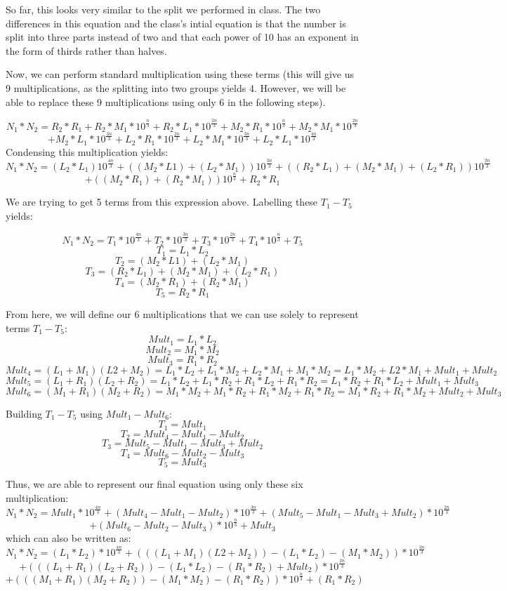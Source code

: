 \documentclass[11pt, solution, letterpaper]{format}
\begin{document}
So far, this looks very similar to the split we performed in class. The two differences in this equation and the class's intial equation is that the number is split into three parts instead of two and that each power of 10 has an exponent in the form of thirds rather than halves.

Now, we can perform standard multiplication using these terms (this will give us 9 multiplications, as the splitting into two groups yields 4. However, we will be able to replace these 9 multiplications using only 6 in the following steps).

$$N_1 * N_2 = R_2 * R_1 + R_2 * M_1 * 10^{\frac{n}{3}} + R_2 * L_1 * 10^{\frac{2n}{3}}  + M_2 * R_1 * 10^{\frac{n}{3}}  + M_2 * M_1 * 10^{\frac{2n}{3}} $$
$$+ M_2 * L_1 * 10^{\frac{3n}{3}} + L_2 * R_1 * 10^{\frac{2n}{3}} + L_2 * M_1 * 10^{\frac{3n}{3}} + L_2 * L_1 * 10^{\frac{4n}{3}}$$
Condensing this multiplication yields:
$$N_1 * N_2 = (L_2 * L_1)10^{\frac{4n}{3}} + ((M_2 * L1) + (L_2 * M_1))10^{\frac{3n}{3}} + ((R_2 * L_1) + (M_2 * M_1) + (L_2 * R_1))10^{\frac{2n}{3}} $$
$$+ ((M_2 * R_1) + (R_2 * M_1))10^{\frac{n}{3}} + R_2 * R_1$$

We are trying to get 5 terms from this expression above.
Labelling these $T_1 - T_5$ yields:

$$N_1 * N_2 = T_1*10^{\frac{4n}{3}} + T_2*10^{\frac{3n}{3}} + T_3*10^{\frac{2n}{3}} + T_4*10^{\frac{n}{3}} + T_5$$
$$T_1 = L_1 * L_2$$
$$T_2 = (M_2 * L1) + (L_2 * M_1) $$
$$T_3 = (R_2 * L_1) + (M_2 * M_1) + (L_2 * R_1) $$
$$T_4 =  (M_2 * R_1) + (R_2 * M_1)$$
$$T_5 = R_2 * R_1$$

From here, we will define our 6 multiplications that we can use solely to represent terms $T_1 - T_5$:
$$Mult_1 = L_1 * L_2 $$
$$Mult_2 = M_1 * M_2 $$
$$Mult_3 = R_1 * R_2 $$
$$Mult_4 = (L_1 + M_1)(L2 + M_2) = L_1*L_2 + L_1*M_2 + L_2*M_1 + M_1 * M_2 = L_1*M_2 + L2*M_1 + Mult_1 + Mult_2 $$
$$Mult_5 = (L_1 + R_1)(L_2 + R_2) = L_1*L_2 + L_1*R_2 + R_1*L_2 + R_1 * R_2 = L_1*R_2 + R_1*L_2 + Mult_1 + Mult_3 $$
$$Mult_6 = (M_1 + R_1)(M_2 + R_2) = M_1*M_2 + M_1*R_2 + R_1*M_2 + R_1*R_2 = M_1*R_2 + R_1*M_2 + Mult_2 + Mult_3 $$

Building $T_1 - T_5$ using $Mult_1 - Mult_6$:
$$T_1 = Mult_1 $$
$$T_2 = Mult_4 - Mult_1 - Mult_2 $$
$$T_3 = Mult_5 - Mult_1 - Mult_3 + Mult_2 $$
$$T_4 = Mult_6 - Mult_2 - Mult_3 $$
$$T_5 = Mult_3 $$

Thus, we are able to represent our final equation using only these six multiplication:
$$N_1 * N_2 = Mult_1*10^{\frac{4n}{3}} + (Mult_4 - Mult_1 - Mult_2)*10^{\frac{3n}{3}} + (Mult_5 - Mult_1 - Mult_3 + Mult_2)*10^{\frac{2n}{3}} $$$$+ (Mult_6 - Mult_2 - Mult_3 )*10^{\frac{n}{3}} + Mult_3$$
which can also be written as:
$$N_1 * N_2 = (L_1 * L_2)*10^{\frac{4n}{3}} + (((L_1 + M_1)(L2 + M_2)) - (L_1 * L_2) - (M_1 * M_2))*10^{\frac{3n}{3}} $$$$+ (((L_1 + R_1)(L_2 + R_2)) - (L_1 * L_2) - (R_1 * R_2) + Mult_2)*10^{\frac{2n}{3}} $$$$+ (((M_1 + R_1)(M_2 + R_2)) - (M_1 * M_2) - (R_1 * R_2) )*10^{\frac{n}{3}} + (R_1 * R_2)$$
\end{document}
